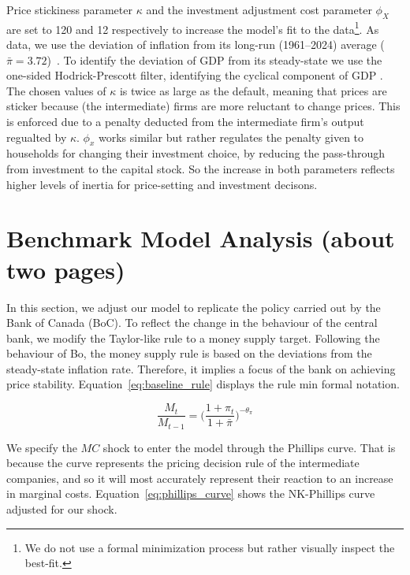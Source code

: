 \documentclass[12pt]{article}
\begin{document}
Price stickiness parameter $\kappa$ and the investment adjustment cost parameter $\phi_X$ are set to 120 and 12 respectively to increase the model's fit to the data\footnote{ We do not use a formal minimization process but rather visually inspect the best-fit.}. As data, we use the deviation of inflation from its long-run (1961--2024) average ($\bar{\pi} =  3.72$)~\parencite{worldbank_inflation_ca}. To identify the deviation of GDP from its steady-state we use the one-sided Hodrick-Prescott filter, identifying the cyclical component of GDP \parencite{fred_gdp_per_capita_ca}. The chosen values of $\kappa$ is twice as large as the default, meaning that prices are sticker because (the intermediate) firms are more reluctant to change prices. This is enforced due to a penalty deducted from the intermediate firm's output regualted by $\kappa$. $\phi_x$ works similar but rather regulates the penalty given to households for changing their investment choice, by reducing the pass-through from investment to the capital stock. So the increase in both parameters reflects higher levels of inertia for price-setting and investment decisons. 

\newpage
\section{Benchmark Model Analysis (about two pages)}\label{s:benchmark_model}

In this section, we adjust our model to replicate the policy carried out by the Bank of Canada (BoC). To reflect the change in the behaviour of the central bank, we modify the Taylor-like rule to a money supply target. Following the behaviour of Bo, the money supply rule is based on the deviations from the steady-state inflation rate. Therefore, it implies a focus of the bank on achieving price stability. Equation~\ref{eq:baseline_rule} displays the rule min formal notation.


\begin{equation}\label{eq:baseline_rule}
    \frac{M_t}{M_{t-1}} = \Big(\frac{1+\pi_{t}}{1+ \bar \pi}\Big)^{-\theta_{\pi}}
\end{equation}

We specify the $MC$ shock to enter the model through the Phillips curve. That is because the curve represents the pricing decision rule of the intermediate companies, and so it will most accurately represent their reaction to an increase in marginal costs. Equation~\ref{eq:phillips_curve} shows the NK-Phillips curve adjusted for our shock. 
\end{document}
